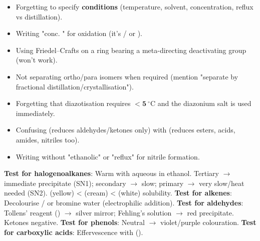 \documentclass[11pt]{article}
\begin{document}
\begin{attention}
\begin{itemize}
\item Forgetting to specify \textbf{conditions} (temperature, solvent, concentration, reflux vs distillation).
\item Writing "conc. " for oxidation (it's / or ).
\item Using Friedel–Crafts on a ring bearing a meta-directing deactivating group (won't work).
\item Not separating ortho/para isomers when required (mention "separate by fractional distillation/crystallisation").
\item Forgetting that diazotisation requires $\mathbf{< \SI{5}{\ensuremath{{}^{\circ}\mathrm{C}}}}$ and the diazonium salt is used immediately.
\item Confusing  (reduces aldehydes/ketones only) with  (reduces esters, acids, amides, nitriles too).
\item Writing  without "ethanolic" or "reflux" for nitrile formation.
\end{itemize}
\end{attention}

\begin{experience}
\textbf{Test for halogenoalkanes}: Warm with aqueous  in ethanol. Tertiary $\rightarrow$ immediate  precipitate (SN1); secondary $\rightarrow$ slow; primary $\rightarrow$ very slow/heat needed (SN2).  (yellow) <  (cream) <  (white) solubility.
\textbf{Test for alkenes}: Decolourise / or bromine water (electrophilic addition).
\textbf{Test for aldehydes}: Tollens' reagent (\ce{[Ag(NH3)2]+}) $\rightarrow$ silver mirror; Fehling's solution $\rightarrow$ red  precipitate. Ketones negative.
\textbf{Test for phenols}: Neutral  $\rightarrow$ violet/purple colouration.
\textbf{Test for carboxylic acids}: Effervescence with  ().
\end{experience}
\end{document}
